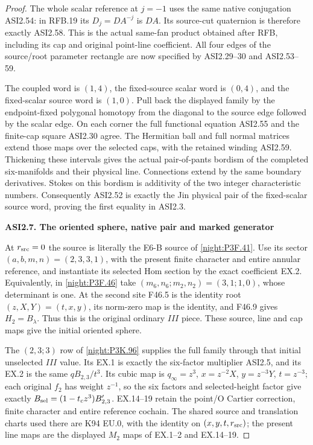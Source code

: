 \begin{proof}
The whole scalar reference at \(j=-1\)
uses the same native conjugation ASI2.54:
in RFB.19 its \(D_j=D A^{-j}\) is \(DA\).
Its source-cut quaternion is therefore
exactly ASI2.58. This is the actual
same-fan product obtained after RFB,
including its cap and original point-line
coefficient. All four edges of the
source/root parameter rectangle are now
specified by ASI2.29--30 and ASI2.53--59.

The coupled word is \((1,4)\), the
fixed-source scalar word is \((0,4)\),
and the fixed-scalar source word is
\((1,0)\). Pull back the displayed
family by the endpoint-fixed polygonal
homotopy from the diagonal to the source
edge followed by the scalar edge.
On each corner the full functional
equation ASI2.55 and the finite-cap
square ASI2.30 agree. The Hermitian
ball and full normal matrices extend
those maps over the selected caps,
with the retained winding ASI2.59.
Thickening these intervals gives the
actual pair-of-pants bordism of the
completed six-manifolds and their
physical line. Connections extend by
the same boundary derivatives.
Stokes on this bordism is additivity
of the two integer characteristic
numbers. Consequently ASI2.52 is
exactly the Jin physical pair of the
fixed-scalar source word, proving
the first equality in ASI2.3.

\par

\medskip\noindent\textbf{ASI2.7. The oriented sphere, native pair and marked generator}

\par\nobreak

At $r_{\rm src}=0$ the source is literally the E6-B source of
\cref{night:P3F.41}.  Use its sector $(a,b,m,n)=(2,3,3,1)$,
with the present finite character and entire annular reference, and
instantiate its selected Hom section by the exact coefficient EX.2.
Equivalently, in \cref{night:P3F.46} take
$(m_6,n_6;m_2,n_2)=(3,1;1,0)$, whose determinant is one.
At the second site F46.5 is the identity root
$(z,X,Y)=(t,x,y)$, its norm-zero map is the identity, and
F46.9 gives $H_2=B_\lambda$.  Thus this is the original ordinary
$III$ piece.  These source, line and cap maps give the initial
oriented sphere.

The $(2,3;3)$ row of \cref{night:P3K.96} supplies the full family
through that initial unselected $III$ value.  Its EX.1 is exactly
the six-factor multiplier ASI2.5, and its EX.2 is the same
$qB_{2,3}/t^3$.  Its cubic map is
$q_\infty=z^3$, $x=z^{-2}X$, $y=z^{-3}Y$, $t=z^{-3}$;
each original $f_2$ has weight $z^{-1}$, so the six factors
and selected-height factor give exactly
$B_{\rm sel}=(1-t_cz^3)B'_{2,3}$.  EX.14--19 retain the point/O
Cartier correction, finite character and entire reference cochain.
The shared source and translation charts used there are K94 EU.0,
with the identity on $(x,y,t,r_{\rm src})$; the present line maps
are the displayed $M_2$ maps of EX.1--2 and EX.14--19.


\end{proof}
